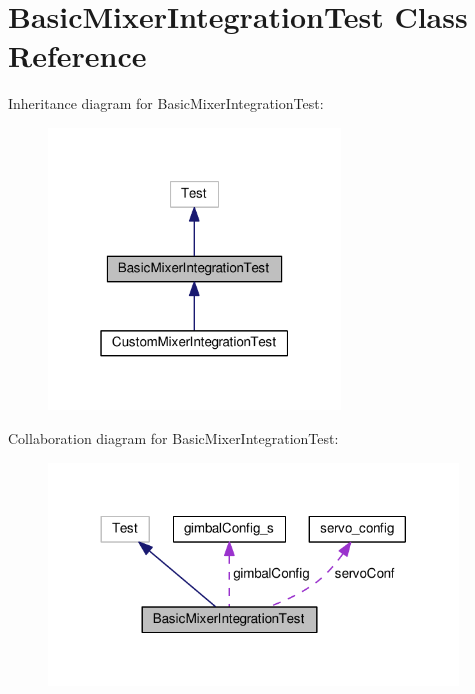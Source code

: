 \hypertarget{classBasicMixerIntegrationTest}{\section{Basic\+Mixer\+Integration\+Test Class Reference}
\label{classBasicMixerIntegrationTest}
}


Inheritance diagram for Basic\+Mixer\+Integration\+Test\+:\nopagebreak
\begin{figure}[H]
\begin{center}
\leavevmode
\includegraphics[width=220pt]{classBasicMixerIntegrationTest__inherit__graph}
\end{center}
\end{figure}


Collaboration diagram for Basic\+Mixer\+Integration\+Test\+:\nopagebreak
\begin{figure}[H]
\begin{center}
\leavevmode
\includegraphics[width=308pt]{classBasicMixerIntegrationTest__coll__graph}
\end{center}
\end{figure}
